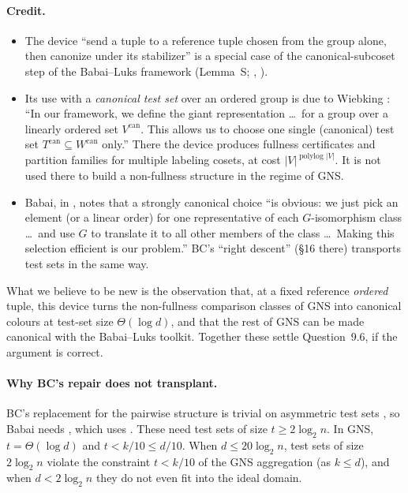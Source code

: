 \documentclass[11pt]{article}
\theoremstyle{plain}
\theoremstyle{definition}
\theoremstyle{remark}
\theoremstyle{named}
\theoremstyle{namedrm}
\newcommand{\polylog}{\operatorname{polylog}}
\begin{document}
\paragraph{Credit.}
\begin{itemize}
\item The device ``send a tuple to a reference tuple chosen from the group alone, then canonize under
  its stabilizer'' is a special case of the canonical-subcoset step of the Babai--Luks framework
  (Lemma~S; \cite[\S2]{BL83}, \cite[\S5]{Bab19}).
\item Its use with a \emph{canonical test set} over an ordered group is due to Wiebking
  \cite[Lemma~5.34, algorithm \textsc{ProdCert}, pp.~101--103]{Wie21}: ``In our framework, we define
  the giant representation \dots\ for a group over a linearly ordered set $V^{\mathrm{can}}$. This allows
  us to choose one single (canonical) test set $T^{\mathrm{can}}\subseteq W^{\mathrm{can}}$ only.''
  There the device produces fullness certificates and partition families for multiple labeling
  cosets, at cost $|V|^{\polylog|V|}$. It is not used there to build a non-fullness structure in the
  regime of GNS.
\item Babai, in \cite[Remark~12.5]{Bab19}, notes that a strongly canonical choice
  ``is obvious: we just pick an element (or a linear order) for one representative of each
  $G$-isomorphism class \dots\ and use $G$ to translate it to all other members of the class \dots\
  Making this selection efficient is our problem.'' BC's ``right descent'' (\S16 there) transports test
  sets in the same way.
\end{itemize}
What we believe to be new is the observation that, at a fixed reference \emph{ordered} tuple, this
device turns the non-fullness comparison classes of GNS into canonical colours at test-set size
$\Theta(\log d)$, and that the rest of GNS can be made canonical with the Babai--Luks toolkit. Together
these settle Question~9.6, if the argument is correct.

\paragraph{Why BC's repair does not transplant.} BC's replacement for the pairwise structure
\cite[Thm.~12.1]{Bab19} is trivial on asymmetric test sets \cite[Cor.~12.3]{Bab19}, so Babai needs
\cite[Claim~12.4]{Bab19}, which uses \cite[Cor.~13.3, Prop.~14.2]{Bab19}. These need test sets of size
$t\ge 2\log_2 n$. In GNS, $t=\Theta(\log d)$ and $t<k/10\le d/10$. When $d\le20\log_2 n$, test sets of size
$2\log_2 n$ violate the constraint $t<k/10$ of the GNS aggregation (as $k\le d$), and when $d<2\log_2 n$
they do not even fit into the ideal domain.
\end{document}
